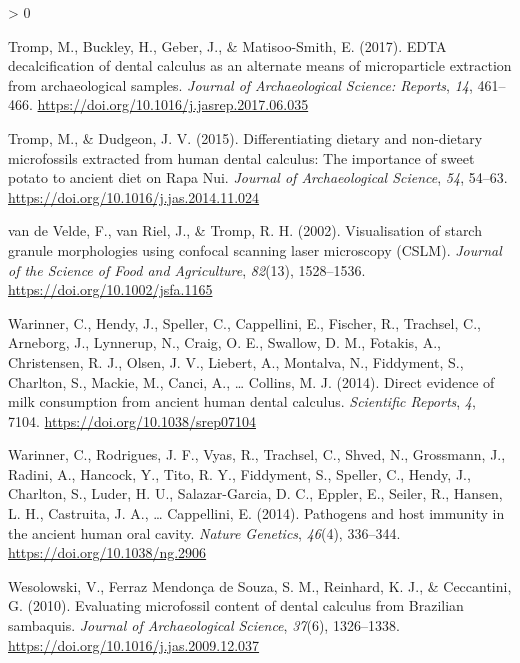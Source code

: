 \documentclass[
]{article}
\newlength{\cslhangindent}
\newenvironment{CSLReferences}[2] %
 {%
  \setlength{\parindent}{0pt}
  \ifodd #1 \everypar{\setlength{\hangindent}{\cslhangindent}}\ignorespaces\fi
  \ifnum #2 > 0
  \setlength{\parskip}{#2\baselineskip}
  \fi
 }%
 {}
\begin{document}
\begin{CSLReferences}{1}{0}
\leavevmode\hypertarget{ref-trompEDTACalculus2017}{}%
Tromp, M., Buckley, H., Geber, J., \& Matisoo-Smith, E. (2017). {EDTA} decalcification of dental calculus as an alternate means of microparticle extraction from archaeological samples. \emph{Journal of Archaeological Science: Reports}, \emph{14}, 461--466. \url{https://doi.org/10.1016/j.jasrep.2017.06.035}

\leavevmode\hypertarget{ref-trompDietaryNondietary2015}{}%
Tromp, M., \& Dudgeon, J. V. (2015). Differentiating dietary and non-dietary microfossils extracted from human dental calculus: The importance of sweet potato to ancient diet on {Rapa Nui}. \emph{Journal of Archaeological Science}, \emph{54}, 54--63. \url{https://doi.org/10.1016/j.jas.2014.11.024}

\leavevmode\hypertarget{ref-vandeveldeStarchMorphology2002}{}%
van de Velde, F., van Riel, J., \& Tromp, R. H. (2002). Visualisation of starch granule morphologies using confocal scanning laser microscopy ({CSLM}). \emph{Journal of the Science of Food and Agriculture}, \emph{82}(13), 1528--1536. \url{https://doi.org/10.1002/jsfa.1165}

\leavevmode\hypertarget{ref-warinnerDirectEvidenceMilk2014}{}%
Warinner, C., Hendy, J., Speller, C., Cappellini, E., Fischer, R., Trachsel, C., Arneborg, J., Lynnerup, N., Craig, O. E., Swallow, D. M., Fotakis, A., Christensen, R. J., Olsen, J. V., Liebert, A., Montalva, N., Fiddyment, S., Charlton, S., Mackie, M., Canci, A., \ldots{} Collins, M. J. (2014). Direct evidence of milk consumption from ancient human dental calculus. \emph{Scientific Reports}, \emph{4}, 7104. \url{https://doi.org/10.1038/srep07104}

\leavevmode\hypertarget{ref-warinnerPathogensHost2014}{}%
Warinner, C., Rodrigues, J. F., Vyas, R., Trachsel, C., Shved, N., Grossmann, J., Radini, A., Hancock, Y., Tito, R. Y., Fiddyment, S., Speller, C., Hendy, J., Charlton, S., Luder, H. U., Salazar-Garcia, D. C., Eppler, E., Seiler, R., Hansen, L. H., Castruita, J. A., \ldots{} Cappellini, E. (2014). Pathogens and host immunity in the ancient human oral cavity. \emph{Nature Genetics}, \emph{46}(4), 336--344. \url{https://doi.org/10.1038/ng.2906}

\leavevmode\hypertarget{ref-wesolowskiEvaluatingMicrofossilContent2010}{}%
Wesolowski, V., Ferraz Mendonça de Souza, S. M., Reinhard, K. J., \& Ceccantini, G. (2010). Evaluating microfossil content of dental calculus from {Brazilian} sambaquis. \emph{Journal of Archaeological Science}, \emph{37}(6), 1326--1338. \url{https://doi.org/10.1016/j.jas.2009.12.037}


\end{CSLReferences}
\end{document}
